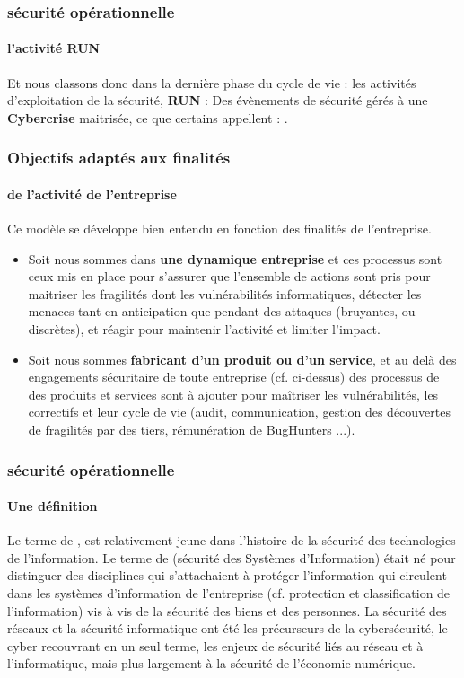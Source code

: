 \begin{frame}
\frametitle<presentation>{sécurité opérationnelle}
\framesubtitle<presentation>{l'activité RUN}

Et nous classons donc dans la dernière phase du cycle de vie : les activités d'exploitation de la sécurité, \textbf{RUN} : Des évènements de sécurité gérés à une \textbf{Cybercrise} maitrisée, ce que certains appellent \textbf{} : .
\end{frame}


\begin{frame}
\frametitle<presentation>{Objectifs adaptés aux finalités}
\framesubtitle<presentation>{de l'activité de l'entreprise}
Ce modèle se développe bien entendu en fonction des finalités de l'entreprise.

\begin{itemize}
    \item Soit nous sommes dans \textbf{une dynamique entreprise} et ces processus sont ceux mis en place pour s'assurer que  l'ensemble de actions sont pris pour maitriser les fragilités dont les vulnérabilités informatiques, détecter les menaces tant en anticipation que pendant des attaques (bruyantes, ou discrètes), et réagir pour maintenir l'activité et limiter l'impact.
    \item  Soit nous sommes \textbf{fabricant d'un produit ou d'un service}, et au delà des engagements sécuritaire de toute entreprise (cf. ci-dessus) des processus de  des produits et services sont à ajouter pour maîtriser les vulnérabilités, les correctifs et leur cycle de vie  (audit, communication, gestion des découvertes de fragilités par des tiers, rémunération de BugHunters ...).
\end{itemize}
\end{frame}

\begin{frame}
\frametitle<presentation>{sécurité opérationnelle}
\framesubtitle<presentation>{Une définition}
 Le terme de , est relativement jeune dans l’histoire de la sécurité des technologies de l’information. Le terme de (sécurité des Systèmes d’Information) était né pour distinguer des disciplines qui s’attachaient à protéger l’information qui circulent dans les systèmes d'information de l’entreprise (cf. protection et classification de l’information) vis à vis de la sécurité des biens et des personnes. La sécurité des réseaux et la sécurité informatique ont été les précurseurs de la cybersécurité, le cyber recouvrant en un seul terme, les enjeux de sécurité liés au réseau et à l’informatique, mais plus largement à la sécurité de l'économie numérique.
\end{frame}

